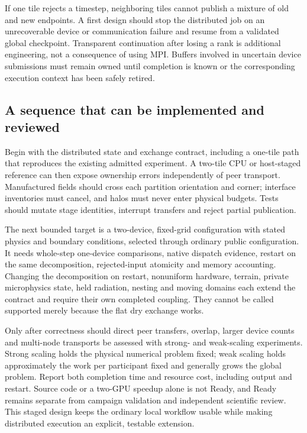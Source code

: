 If one tile rejects a timestep, neighboring tiles cannot publish a mixture of
old and new endpoints. A first design should stop the distributed job on an
unrecoverable device or communication failure and resume from a validated
global checkpoint. Transparent continuation after losing a rank is additional
engineering, not a consequence of using MPI. Buffers involved in uncertain
device submissions must remain owned until completion is known or the
corresponding execution context has been safely retired.

\subsection{A sequence that can be implemented and reviewed}

Begin with the distributed state and exchange contract, including a one-tile
path that reproduces the existing admitted experiment. A two-tile CPU or
host-staged reference can then expose ownership errors independently of peer
transport. Manufactured fields should cross each partition orientation and
corner; interface inventories must cancel, and halos must never enter physical
budgets. Tests should mutate stage identities, interrupt transfers and reject
partial publication.

The next bounded target is a two-device, fixed-grid configuration with stated
physics and boundary conditions, selected through ordinary public configuration.
It needs whole-step one-device comparisons, native dispatch evidence, restart
on the same decomposition, rejected-input atomicity and memory accounting.
Changing the decomposition on restart, nonuniform hardware, terrain, private
microphysics state, held radiation, nesting and moving domains each extend the
contract and require their own completed coupling. They cannot be called
supported merely because the flat dry exchange works.

Only after correctness should direct peer transfers, overlap, larger device
counts and multi-node transports be assessed with strong- and weak-scaling
experiments. Strong scaling holds the physical numerical problem fixed; weak
scaling holds approximately the work per participant fixed and generally grows
the global problem. Report both completion time and resource cost, including
output and restart. Source code or a two-GPU speedup alone is not Ready, and
Ready remains separate from campaign validation and independent scientific
review. This staged design keeps the ordinary local workflow usable while
making distributed execution an explicit, testable extension.
